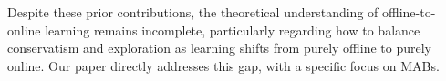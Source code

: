 Despite these prior contributions, the theoretical understanding of offline-to-online learning remains incomplete, particularly regarding how to balance conservatism and exploration as learning shifts from purely offline to purely online. Our paper directly addresses this gap, with a specific focus on MABs.